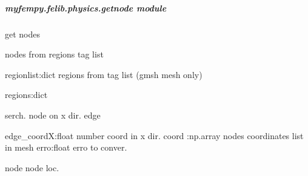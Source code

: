 \documentclass[letterpaper,10pt,english]{sphinxmanual}
\begin{document}
\subparagraph{myfempy.felib.physics.getnode module}
\label{\detokenize{myfempy.felib.physics:module-myfempy.felib.physics.getnode}}\label{\detokenize{myfempy.felib.physics:myfempy-felib-physics-getnode-module}}
\sphinxAtStartPar
get nodes

\begin{fulllineitems}
\label{\detokenize{myfempy.felib.physics:myfempy.felib.physics.getnode.nodes_from_regions}}
\pysigstartsignatures
{}
\pysigstopsignatures
\sphinxAtStartPar
nodes from regions tag list
\begin{description}
\sphinxAtStartPar
regionlist:dict    \textendash{} regions from tag list (gmsh mesh only)

\sphinxAtStartPar
regions:dict

\end{description}

\end{fulllineitems}


\begin{fulllineitems}
\label{\detokenize{myfempy.felib.physics:myfempy.felib.physics.getnode.search_edgex}}
\pysigstartsignatures
{}
\pysigstopsignatures
\sphinxAtStartPar
serch. node  on x dir. edge
\begin{description}
\sphinxAtStartPar
edge\_coordX:float   \textendash{} number coord in x dir.
coord :np.array     \textendash{} nodes coordinates list in mesh
erro:float          \textendash{} erro to conver.

\sphinxAtStartPar
node                \textendash{} node loc.

\end{description}

\end{fulllineitems}
\end{document}
